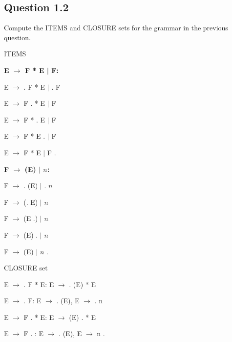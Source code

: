 \documentclass[11pt, oneside]{article}   	%
\begin{document}
\subsection*{Question 1.2} 
\par Compute the ITEMS and CLOSURE sets for the grammar in the previous question.
\par ITEMS
\par \textbf{E $\rightarrow$ F * E $|$ F:}
\par E $\rightarrow$ . F * E $|$ . F
\par E $\rightarrow$ F . * E $|$ F
\par E $\rightarrow$ F * . E $|$ F
\par E $\rightarrow$ F * E . $|$ F
\par E $\rightarrow$ F * E $|$ F .
\par \textbf{F $\rightarrow$ (E) $|$ $n$:}
\par F $\rightarrow$ . (E) $|$ . $n$
\par F $\rightarrow$ (. E) $|$ $n$
\par F $\rightarrow$ (E .) $|$ $n$
\par F $\rightarrow$ (E) . $|$ $n$
\par F $\rightarrow$ (E) $|$ $n$ .
\\
\par CLOSURE set	
\\
\par E $\rightarrow$ . F * E: E $\rightarrow$ . (E) * E
\par E $\rightarrow$ . F: E $\rightarrow$ . (E), E $\rightarrow$ . n
\\
\par E $\rightarrow$ F . * E: E $\rightarrow$ (E) . * E
\par E $\rightarrow$ F . : E $\rightarrow$ . (E), E $\rightarrow$ n .
\end{document}
